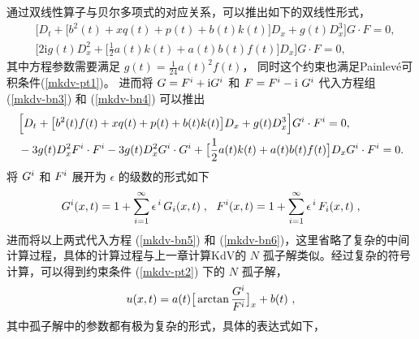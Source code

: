通过双线性算子与贝尔多项式的对应关系，可以推出如下的双线性形式，
\begin{align}
&
\Big [ D_t+  \big[b^2(t)+x q(t) +p(t)+b(t)k(t)\big]D_x +
g(t)D_x^3  \Big ]G \cdot F =0, \label{mkdv-bn3} \\
&\Big [2\mbox{i} g(t)D_x^2+ \big[\frac{1}{2}a(t)k(t)+a(t)b(t)f(t)\big] D_x \Big ] G \cdot F =0, \label{mkdv-bn4}
\end{align}
其中方程参数需要满足 $g(t)=\frac{1}{24} a(t)^2 f(t)$， 同时这个约束也满足Painlev\'{e}可积条件(\ref{mkdv-pt1})。
进而将 $G = F^{\uppercase\expandafter{\romannumeral 1}} + \mbox{i}G^{\uppercase\expandafter{\romannumeral 1}}$ 和 $F = F^{\uppercase\expandafter{\romannumeral 1}} - \mbox{i } G^{\uppercase\expandafter{\romannumeral 1}}$
代入方程组 (\ref{mkdv-bn3}) 和 (\ref{mkdv-bn4}) 可以推出
\begin{align}
&\Big [ D_t+  \big[b^2(t)f(t)+x q(t) +p(t)+b(t)k(t)\big]D_x +
g(t)D_x^3  \Big ]G^{\uppercase\expandafter{\romannumeral 1}} \cdot F^{\uppercase\expandafter{\romannumeral 1}} =0,\label{mkdv-bn5}\\
&
-3 g(t) D_x^2 F^{\uppercase\expandafter{\romannumeral 1}} \cdot F^{\uppercase\expandafter{\romannumeral 1}} -3 g(t) D_x^2 G^{\uppercase\expandafter{\romannumeral 1}} \cdot G^{\uppercase\expandafter{\romannumeral 1}} +\big[\frac{1}{2}a(t)k(t)+a(t)b(t)f(t)\big] D_x G^{\uppercase\expandafter{\romannumeral 1}} \cdot F^{\uppercase\expandafter{\romannumeral 1}} =0.\label{mkdv-bn6}
\end{align}
将 $G^{\uppercase\expandafter{\romannumeral 1}}$ 和 $F^{\uppercase\expandafter{\romannumeral 1}}$ 展开为 $ \epsilon $ 的级数的形式如下
\begin{equation}
G^{\uppercase\expandafter{\romannumeral 1}}(x,t)=1+\sum_{i = 1}^{\infty}
\epsilon^{\,i}\,G_{i}(x,t)\;, \ \
F^{\uppercase\expandafter{\romannumeral 1}}(x,t)=1+\sum_{i = 1}^{\infty}
\epsilon^{\,i}\,F_{i}(x,t)\;, \label{mkdv-bn8}
\end{equation}
进而将以上两式代入方程 (\ref{mkdv-bn5}) 和 (\ref{mkdv-bn6})，这里省略了复杂的中间计算过程，具体的计算过程与上一章计算KdV的 $N$ 孤子解类似。经过复杂的符号计算，可以得到约束条件 (\ref{mkdv-pt2}) 下的 $N$ 孤子解，
\begin{equation}
u(x,t) =a(t)\big[ \arctan{\frac{G^{\uppercase\expandafter{\romannumeral 1}}}{F^{\uppercase\expandafter{\romannumeral 1}}}}  \big]_x +b(t)\ ,\label{mkdv-bn9}
\end{equation}
其中孤子解中的参数都有极为复杂的形式，具体的表达式如下，
